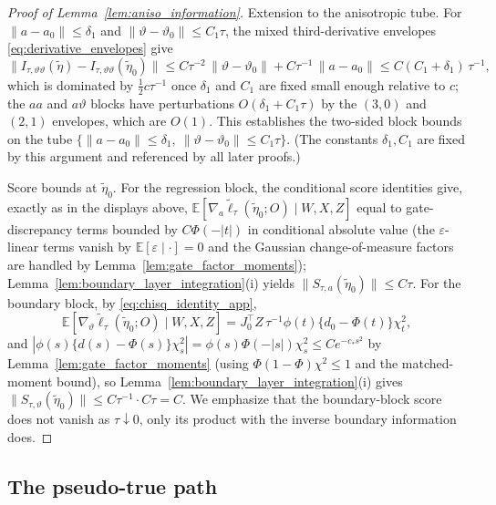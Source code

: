 \documentclass[11pt]{article}
\theoremstyle{definition}
\theoremstyle{plain}
\newcommand{\E}{\mathbb{E}}
\begin{document}
\begin{proof}[Proof of Lemma~\ref{lem:aniso_information}]
Extension to the anisotropic tube. For $\|a-a_0\|\le\delta_1$ and $\|\vartheta-\vartheta_0\|\le C_1\tau$, the mixed third-derivative envelopes \eqref{eq:derivative_envelopes} give
\[
\|I_{\tau,\vartheta\vartheta}(\tilde\eta)-I_{\tau,\vartheta\vartheta}(\tilde\eta_0)\|
\le C\tau^{-2}\,\|\vartheta-\vartheta_0\|+C\tau^{-1}\,\|a-a_0\|
\le C(C_1+\delta_1)\,\tau^{-1},
\]
which is dominated by $\tfrac12c\tau^{-1}$ once $\delta_1$ and $C_1$ are fixed small enough relative to $c$; the $aa$ and $a\vartheta$ blocks have perturbations $O(\delta_1+C_1\tau)$ by the $(3,0)$ and $(2,1)$ envelopes, which are $O(1)$. This establishes the two-sided block bounds on the tube $\{\|a-a_0\|\le\delta_1,\ \|\vartheta-\vartheta_0\|\le C_1\tau\}$. (The constants $\delta_1,C_1$ are fixed by this argument and referenced by all later proofs.)

Score bounds at $\tilde\eta_0$. For the regression block, the conditional score identities give, exactly as in the displays above,
$\E[\nabla_a\tilde\ell_\tau(\tilde\eta_0;O)\mid W,X,Z]$ equal to gate-discrepancy terms bounded by $C\Phi(-|t|)$ in conditional absolute value (the $\varepsilon$-linear terms vanish by $\E[\varepsilon\mid\cdot]=0$ and the Gaussian change-of-measure factors are handled by Lemma~\ref{lem:gate_factor_moments}); Lemma~\ref{lem:boundary_layer_integration}(i) yields $\|S_{\tau,a}(\tilde\eta_0)\|\le C\tau$. For the boundary block, by \eqref{eq:chisq_identity_app},
\[
\E[\nabla_\vartheta\tilde\ell_\tau(\tilde\eta_0;O)\mid W,X,Z]
=J_0^\top Z\,\tau^{-1}\phi(t)\{d_0-\Phi(t)\}\chi^2_t ,
\]
and $|\phi(s)\{d(s)-\Phi(s)\}\chi^2_s|=\phi(s)\Phi(-|s|)\chi^2_s\le Ce^{-c_*s^2}$ by Lemma~\ref{lem:gate_factor_moments} (using $\Phi(1-\Phi)\chi^2\le1$ and the matched-moment bound), so Lemma~\ref{lem:boundary_layer_integration}(i) gives $\|S_{\tau,\vartheta}(\tilde\eta_0)\|\le C\tau^{-1}\cdot C\tau=C$. We emphasize that the boundary-block score does not vanish as $\tau\downarrow0$, only its product with the inverse boundary information does.
\end{proof}

\subsection{The pseudo-true path}
\end{document}
